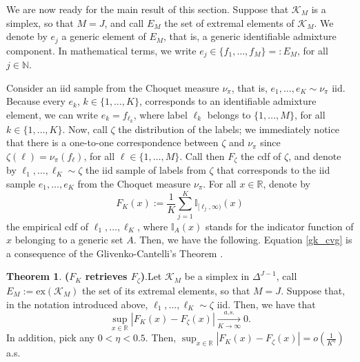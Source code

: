 \documentclass[12pt, reqno]{amsart}
\theoremstyle{definition}
\newtheorem{theorem}{Theorem}%
\begin{document}
We are now ready for the main result of this section. Suppose that $\mathcal{K}_M$ is a simplex, so that $M=J$, and call $E_M$ the set of extremal elements of $\mathcal{K}_M$. We denote by $e_j$ a generic element of $E_M$, that is, a generic identifiable admixture component. In mathematical terms, we write $e_j\in\{f_1,\ldots,f_M\}=:E_M$, for all $j\in\mathbb{N}$. 

Consider an iid sample from the Choquet measure $\nu_{\pi}$, that is, $e_1,\ldots,e_K \sim \nu_{\pi}$ iid. Because every $e_k$, $k\in \{1,\ldots,K\}$, corresponds to an identifiable admixture element, we can write $e_k=f_{\ell_k}$, where label $\ell_k$ belongs to $\{1,\ldots,M\}$, for all $k\in\{1,\ldots,K\}$. Now, call $\zeta$ the distribution of the labels; we immediately notice that there is a one-to-one correspondence between $\zeta$ and $\nu_{\pi}$ since $\zeta(\ell)=\nu_{\pi}(f_{\ell})$, for all $\ell\in\{1,\ldots,M\}$. Call then $F_\zeta$ the cdf of $\zeta$, and denote by $\ell_1,\ldots,\ell_K\sim \zeta$ the iid sample of labels from $\zeta$ that corresponds to the iid sample $e_1,\ldots,e_K$ from the Choquet measure $\nu_{\pi}$. For all $x\in\mathbb{R}$, denote by
$$F_K(x):=\frac{1}{K}\sum_{j=1}^K \mathbb{I}_{[\ell_j,\infty)}(x)$$
the empirical cdf of $\ell_1,\ldots,\ell_K$, where $\mathbb{I}_A(x)$ stands for the indicator function of $x$ belonging to a generic set $A$. Then, we have the following. Equation \eqref{gk_cvg} is a consequence of the Glivenko-Cantelli's Theorem \cite{vdv_asy}. 

\begin{theorem}{\textbf{($F_K$ retrieves $F_\zeta$)}.}\label{thm1}
    Let $\mathcal{K}_M$ be a simplex in $\Delta^{J-1}$, call $E_M:=\text{ex}(\mathcal{K}_M)$ the set of its extremal elements, so that $M=J$. Suppose that, in the notation introduced above, $\ell_1,\ldots,\ell_K\sim \zeta$ iid. Then, we have that 
\begin{equation}\label{gk_cvg}
    \sup_{x\in\mathbb{R}} \left| F_K(x)-F_\zeta(x) \right| \xrightarrow[K\rightarrow\infty]{a.s.} 0.
\end{equation}
In addition, pick any $0 < \eta < 0.5$. Then, $\sup_{x\in\mathbb{R}} \left| F_K(x)-F_\zeta(x) \right| = o \left( \frac{1}{K^\eta} \right)$ a.s.
\end{theorem}
\end{document}
